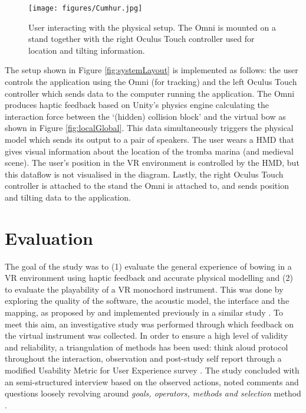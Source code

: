 
\begin{figure}[t]\texttt{[image: figures/Cumhur.jpg]}
\centering
    \caption{User interacting with the physical setup. The Omni is mounted on a  stand together with the right Oculus Touch controller used for location and tilting information. \label{fig:physicalSetup}}
\end{figure}
The setup shown in Figure \ref{fig:systemLayout} is implemented as follows: the user controls the application using the Omni (for tracking) and the left Oculus Touch controller which sends data to the computer running the application. The Omni produces haptic feedback based on Unity's physics engine calculating the interaction force between  the `(hidden) collision block'  and the virtual bow as shown in Figure \ref{fig:localGlobal}. This data simultaneously triggers the physical model which sends its output to a pair of speakers. The user wears a HMD that gives visual information about the location of the tromba marina (and medieval scene). The user's position in the VR environment is controlled by the HMD, but this dataflow is not visualised in the diagram. Lastly, the right Oculus Touch controller is attached to the stand the Omni is attached to, and sends position and tilting data to the application.



\section{Evaluation}\label{sec:eval}

The goal of the study was to (1) evaluate the  general experience of bowing in a VR environment using haptic feedback and accurate physical modelling and (2) to evaluate the  playability of a VR monochord instrument. This was done by exploring the quality of the software, the acoustic model, the interface and the mapping, as proposed by \cite{Barbosa2015} and implemented previously in a similar study \cite{Young2003}. To meet this aim, an investigative study was performed through which feedback on the virtual instrument was collected. In order to ensure a high level of validity and reliability, a triangulation of methods has been used: think aloud protocol \cite{Someren1994} throughout the interaction, observation and post-study self report through a modified Usability Metric for User Experience survey \cite{Finstad2010}. The study concluded with an semi-structured interview based on the observed actions, noted comments and questions loosely revolving around \textit{goals, operators, methods and selection} method \cite{Card1983}.

